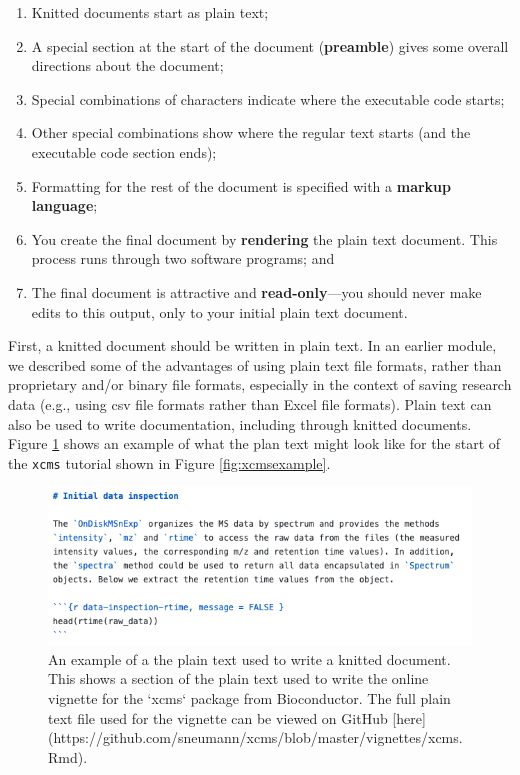 \documentclass[]{tufte-book}
\providecommand{\tightlist}{%
  \setlength{\itemsep}{0pt}\setlength{\parskip}{0pt}}
\begin{document}
\begin{enumerate}
\def\labelenumi{\arabic{enumi}.}
\tightlist
\item
  Knitted documents start as plain text;
\item
  A special section at the start of the document (\textbf{preamble}) gives some
  overall directions about the document;
\item
  Special combinations of characters indicate where the executable code starts;
\item
  Other special combinations show where the regular text starts (and the
  executable code section ends);
\item
  Formatting for the rest of the document is specified with a \textbf{markup
  language};
\item
  You create the final document by \textbf{rendering} the plain text document. This
  process runs through two software programs; and
\item
  The final document is attractive and \textbf{read-only}---you should never make
  edits to this output, only to your initial plain text document.
\end{enumerate}

First, a knitted document should be written in plain text. In an earlier module,
we described some of the advantages of using plain text file formats, rather
than proprietary and/or binary file formats, especially in the context of saving
research data (e.g., using csv file formats rather than Excel file formats).
Plain text can also be used to write documentation, including through knitted
documents. Figure \ref{fig:xcmsexampleplain} shows an example of what the plan text might look like for the
start of the \texttt{xcms} tutorial shown in Figure \ref{fig:xcmsexample}.

\begin{figure}
\includegraphics[width=\textwidth]{figures/plaintext_vignette_example} \caption[An example of a the plain text used to write a knitted document]{An example of a the plain text used to write a knitted document. This shows a section of the plain text used to write the online vignette for the `xcms` package from Bioconductor. The full plain text file used for the vignette can be viewed on GitHub [here](https://github.com/sneumann/xcms/blob/master/vignettes/xcms.Rmd).}\label{fig:xcmsexampleplain}
\end{figure}
\end{document}
